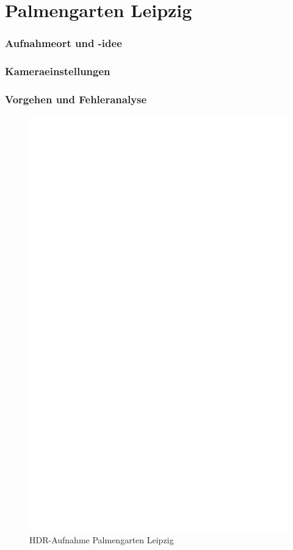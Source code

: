 \documentclass[liststotoc,bibtotoc,fontsize=14pt,]{scrreprt}
\begin{document}
	\section{Palmengarten Leipzig}
	\label{sec:palme}
	\subsubsection{Aufnahmeort und -idee}
	
		\subsubsection{Kameraeinstellungen}
	
		
	\subsubsection{Vorgehen und Fehleranalyse}


			 \newpage
			 \begin{figure}[h]
			 	\includegraphics[width=\linewidth]{img/ph.jpg}
			 	\caption{HDR-Aufnahme Palmengarten Leipzig}
			 \end{figure}
\end{document}
